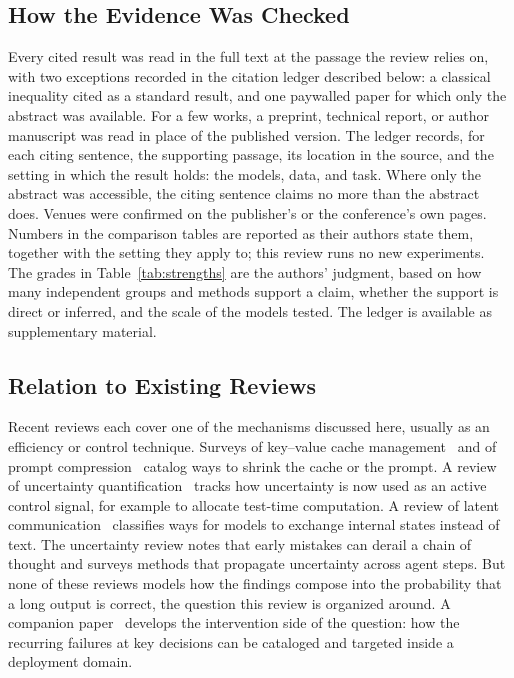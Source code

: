 \documentclass{ieeeaccess}
\begin{document}
\subsection{How the Evidence Was Checked}
Every cited result was read in the full text at the passage the review relies on, with two exceptions recorded in the citation ledger described below: a classical inequality cited as a standard result, and one paywalled paper for which only the abstract was available. For a few works, a preprint, technical report, or author manuscript was read in place of the published version. The ledger records, for each citing sentence, the supporting passage, its location in the source, and the setting in which the result holds: the models, data, and task. Where only the abstract was accessible, the citing sentence claims no more than the abstract does. Venues were confirmed on the publisher's or the conference's own pages. Numbers in the comparison tables are reported as their authors state them, together with the setting they apply to; this review runs no new experiments. The grades in Table~\ref{tab:strengths} are the authors' judgment, based on how many independent groups and methods support a claim, whether the support is direct or inferred, and the scale of the models tested. The ledger is available as supplementary material.

\subsection{Relation to Existing Reviews}
Recent reviews each cover one of the mechanisms discussed here, usually as an efficiency or control technique. Surveys of key--value cache management~\cite{li2025kvsurvey} and of prompt compression~\cite{li2024promptsurvey} catalog ways to shrink the cache or the prompt. A review of uncertainty quantification~\cite{zhang2026activeuq} tracks how uncertainty is now used as an active control signal, for example to allocate test-time computation. A review of latent communication~\cite{liu2026latentsurvey} classifies ways for models to exchange internal states instead of text. The uncertainty review notes that early mistakes can derail a chain of thought and surveys methods that propagate uncertainty across agent steps. But none of these reviews models how the findings compose into the probability that a long output is correct, the question this review is organized around. A companion paper~\cite{arbuzov2026architecture} develops the intervention side of the question: how the recurring failures at key decisions can be cataloged and targeted inside a deployment domain.
\end{document}
